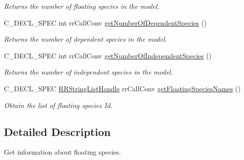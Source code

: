 \begin{DoxyCompactItemize}
\begin{DoxyCompactList}\small\item\em \-Returns the number of floating species in the model. \end{DoxyCompactList}\item 
\hypertarget{group__utility_ga7d573d16a02b3bf4361c00065f624e0b}{
\-C\-\_\-\-D\-E\-C\-L\-\_\-\-S\-P\-E\-C int rr\-Call\-Conv \hyperlink{group__utility_ga7d573d16a02b3bf4361c00065f624e0b}{get\-Number\-Of\-Dependent\-Species} ()}
\label{group__utility_ga7d573d16a02b3bf4361c00065f624e0b}

\begin{DoxyCompactList}\small\item\em \-Returns the number of dependent species in the model. \end{DoxyCompactList}\item 
\hypertarget{group__utility_ga29811c87b0f144e506c93373418fbe8b}{
\-C\-\_\-\-D\-E\-C\-L\-\_\-\-S\-P\-E\-C int rr\-Call\-Conv \hyperlink{group__utility_ga29811c87b0f144e506c93373418fbe8b}{get\-Number\-Of\-Independent\-Species} ()}
\label{group__utility_ga29811c87b0f144e506c93373418fbe8b}

\begin{DoxyCompactList}\small\item\em \-Returns the number of independent species in the model. \end{DoxyCompactList}\item 
\-C\-\_\-\-D\-E\-C\-L\-\_\-\-S\-P\-E\-C \hyperlink{rr__c__types_8h_abf561b014879247b7b92ee99c205de21}{\-R\-R\-String\-List\-Handle} \*
rr\-Call\-Conv \hyperlink{group__utility_ga468d9d0cc8489ae85f4fd78d9fab343e}{get\-Floating\-Species\-Names} ()
\begin{DoxyCompactList}\small\item\em \-Obtain the list of floating species \-Id. \end{DoxyCompactList}\end{DoxyCompactItemize}


\subsection{\-Detailed \-Description}
\-Get information about floating species. 

